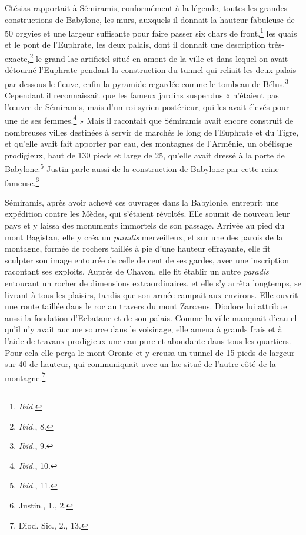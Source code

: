 \documentclass[a4paper, 11pt, oneside]{article}
\begin{document}
Ctésias rapportait à Sémiramis, conformément à la légende, toutes les grandes constructions de Babylone, les murs, auxquels il donnait la hauteur fabuleuse de 50 orgyies et une largeur suffisante pour faire passer six chars de front,\footnote{\emph{Ibid.}} les quais et le pont de l'Euphrate, les deux palais, dont il donnait une description très-exacte,\footnote{\emph{Ibid.}, 8.} le grand lac artificiel situé en amont de la ville et dans lequel on avait détourné l'Euphrate pendant la construction du tunnel qui reliait les deux palais par-dessous le fleuve, enfin la pyramide regardée comme le tombeau de Bélus.\footnote{\emph{Ibid.}, 9.} Cependant il reconnaissait que les fameux jardins suspendus « n'étaient pas l'œuvre de Sémiramis, mais d'un roi syrien postérieur, qui les avait élevés pour une de ses femmes.\footnote{\emph{Ibid.}, 10.} » Mais il racontait que Sémiramis avait encore construit de nombreuses villes destinées à servir de marchés le long de l'Euphrate et du Tigre, et qu'elle avait fait apporter par eau, des montagnes de l'Arménie, un obélisque prodigieux, haut de 130 pieds et large de 25, qu'elle avait dressé à la porte de Babylone.\footnote{\emph{Ibid.}, 11.} Justin parle aussi de la construction de Babylone par cette reine fameuse.\footnote{Justin., 1., 2.}

Sémiramis, après avoir achevé ces ouvrages dans la Babylonie, entreprit une expédition contre les Mèdes, qui s'étaient révoltés. Elle soumit de nouveau leur pays et y laissa des monuments immortels de son passage. Arrivée au pied du mont Bagistan, elle y créa un \emph{paradis} merveilleux, et sur une des parois de la montagne, formée de rochers taillés à pie d'une hauteur effrayante, elle fit sculpter son image entourée de celle de cent de ses gardes, avec une inscription racontant ses exploits. Auprès de Chavon, elle fit établir un autre \emph{paradis} entourant un rocher de dimensions extraordinaires, et elle s'y arrêta longtemps, se livrant à tous les plaisirs, tandis que son armée campait aux environs. Elle ouvrit une route taillée dans le roc au travers du mont Zarcæus. Diodore lui attribue aussi la fondation d'Ecbatane et de son palais. Comme la ville manquait d'eau el qu'il n'y avait aucune source dans le voisinage, elle amena à grands frais et à l'aide de travaux prodigieux une eau pure et abondante dans tous les quartiers. Pour cela elle perça le mont Oronte et y creusa un tunnel de 15 pieds de largeur sur 40 de hauteur, qui communiquait avec un lac situé de l'autre côté de la montagne.\footnote{Diod. Sic., 2., 13.}
\end{document}
